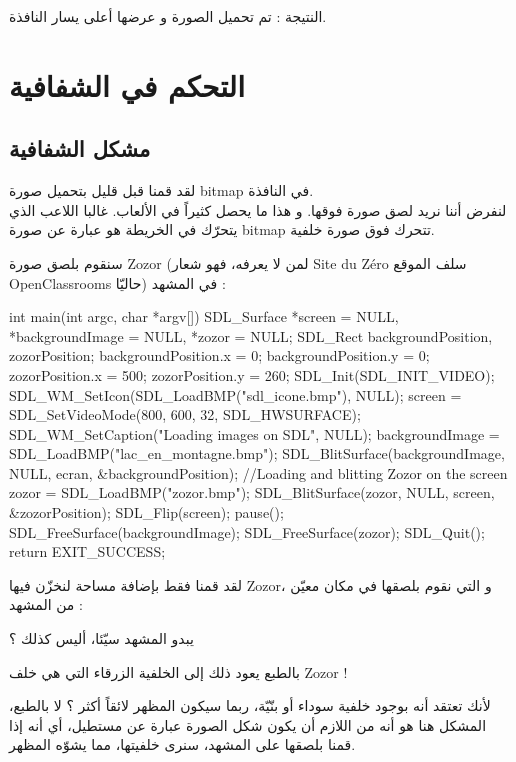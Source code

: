 النتيجة : تم تحميل الصورة و عرضها أعلى يسار النافذة.

\section{التحكم في الشفافية}

\subsection{مشكل الشفافية}

لقد قمنا قبل قليل بتحميل صورة 
\textenglish{bitmap}
في النافذة.\\
لنفرض أننا نريد لصق صورة فوقها. و هذا ما يحصل كثيراً في الألعاب. غالبا اللاعب الذي يتحرّك في الخريطة هو عبارة عن صورة 
\textenglish{bitmap}
تتحرك فوق صورة خلفية.

سنقوم بلصق صورة
\textenglish{Zozor}
(لمن لا يعرفه، فهو شعار
\textenglish{Site du Zéro}
سلف الموقع 
\textenglish{OpenClassrooms}
حاليّا) في المشهد :

\begin{Csource}
int main(int argc, char *argv[])
{
	SDL_Surface *screen = NULL, *backgroundImage = NULL, *zozor = NULL;
	SDL_Rect backgroundPosition, zozorPosition;
	backgroundPosition.x = 0;
	backgroundPosition.y = 0;
	zozorPosition.x = 500;
	zozorPosition.y = 260;
	SDL_Init(SDL_INIT_VIDEO);
	SDL_WM_SetIcon(SDL_LoadBMP("sdl_icone.bmp"), NULL);
	screen = SDL_SetVideoMode(800, 600, 32, SDL_HWSURFACE);
	SDL_WM_SetCaption("Loading images on SDL", NULL);
	backgroundImage = SDL_LoadBMP("lac_en_montagne.bmp");
	SDL_BlitSurface(backgroundImage, NULL, ecran, &backgroundPosition);
	//Loading and blitting Zozor on the screen
	zozor = SDL_LoadBMP("zozor.bmp");
	SDL_BlitSurface(zozor, NULL, screen, &zozorPosition);
	SDL_Flip(screen);
	pause();
	SDL_FreeSurface(backgroundImage);
	SDL_FreeSurface(zozor);
	SDL_Quit();
	return EXIT_SUCCESS;
}
\end{Csource}

لقد قمنا فقط بإضافة مساحة لنخزّن فيها 
\textenglish{Zozor}،
و التي نقوم بلصقها في مكان معيّن من المشهد :


يبدو المشهد سيّئا، أليس كذلك ؟

\begin{question}
بالطبع يعود ذلك إلى الخلفية الزرقاء التي هي خلف 
\textenglish{Zozor} !
\end{question}

لأنك تعتقد أنه بوجود خلفية سوداء أو بنّيّة، ربما سيكون المظهر لائقاً أكثر ؟ لا بالطبع، المشكل هنا هو أنه من اللازم أن يكون شكل الصورة عبارة عن مستطيل، أي أنه إذا قمنا بلصقها على المشهد، سنرى خلفيتها، مما يشوّه المظهر.

